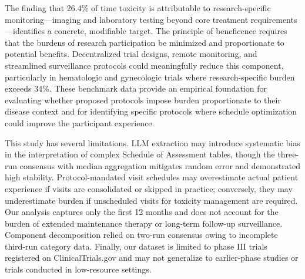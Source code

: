 \documentclass[12pt]{article}
\begin{document}
The finding that 26.4\% of time toxicity is attributable to research-specific monitoring---imaging and laboratory testing beyond core treatment requirements---identifies a concrete, modifiable target. The principle of beneficence requires that the burdens of research participation be minimized and proportionate to potential benefits.\cite{belmont} Decentralized trial designs, remote monitoring, and streamlined surveillance protocols could meaningfully reduce this component,\cite{khozin2019,marra2021} particularly in hematologic and gynecologic trials where research-specific burden exceeds 34\%. These benchmark data provide an empirical foundation for evaluating whether proposed protocols impose burden proportionate to their disease context and for identifying specific protocols where schedule optimization could improve the participant experience.

This study has several limitations. LLM extraction may introduce systematic bias in the interpretation of complex Schedule of Assessment tables, though the three-run consensus with median aggregation mitigates random error and demonstrated high stability. Protocol-mandated visit schedules may overestimate actual patient experience if visits are consolidated or skipped in practice; conversely, they may underestimate burden if unscheduled visits for toxicity management are required. Our analysis captures only the first 12 months and does not account for the burden of extended maintenance therapy or long-term follow-up surveillance. Component decomposition relied on two-run consensus owing to incomplete third-run category data. Finally, our dataset is limited to phase III trials registered on ClinicalTrials.gov and may not generalize to earlier-phase studies or trials conducted in low-resource settings.
\end{document}
